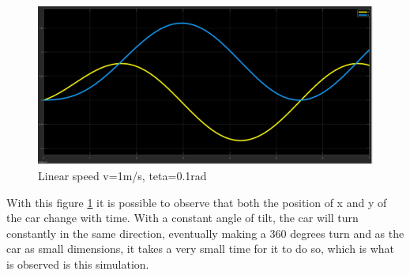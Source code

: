 \begin{figure}[!ht]
\centering
\includegraphics[width=1.0\textwidth]{./img/xy101.png}
\caption {\label{fig:sim2 - pos}Linear speed v=1m/s, teta=0.1rad}
\end{figure}
With this figure \ref{fig:sim2 - pos} it is possible to observe that both the position of x and y of the car change with time. With a constant angle of tilt, the car will turn constantly in the same direction, eventually making a 360 degrees turn and as the car as small dimensions, it takes a very small time for it to do so, which is what is observed is this simulation.